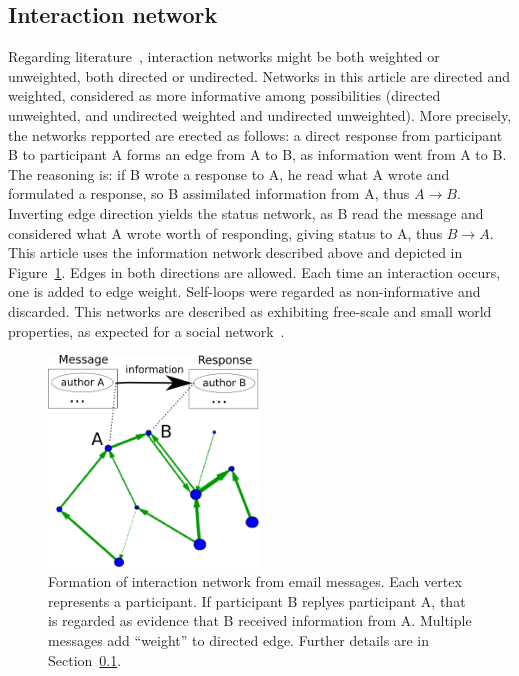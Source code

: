 \documentclass[%
 aip,
 jmp,%
 amsmath,amssymb,
 reprint,%
]{revtex4-1}
\begin{document}
    \subsection{Interaction network}\label{intNet}
Regarding literature~\cite{bird,newmanCommunityDirected,newmanCommunity2013}, interaction networks might be both weighted or unweighted, both directed or undirected. Networks in this article are directed and weighted, considered as more informative among possibilities (directed unweighted, and undirected weighted and undirected unweighted).
More precisely, the networks repported are erected as follows: a direct response from participant B to participant A forms an edge from A to B, as information went from A to B. The reasoning is: if B wrote a response to A, he read what A wrote and formulated a response, so B assimilated information from A, thus $A \rightarrow B$. Inverting edge direction yields the status network, as B read the message and considered what A wrote worth of responding, giving status to A, thus $B\rightarrow A$. This article uses the information network described above and depicted in Figure~\ref{formationNetwork}. Edges in both directions are allowed. Each time an interaction occurs, one is added to edge weight. Self-loops were regarded as non-informative and discarded. This networks are described as exhibiting free-scale and small world properties, as expected for a social network~\cite{bird}.

\begin{figure}[hb]
    \centering
    \includegraphics[width=0.5\textwidth]{figs/criaRede_}
    \caption{Formation of interaction network from email messages. Each vertex represents a participant. If participant B replyes participant A, that is regarded as evidence that B received information from A. Multiple messages add ``weight'' to directed edge. Further details are in Section~\ref{intNet}.}
    \label{formationNetwork}
\end{figure}
\end{document}
